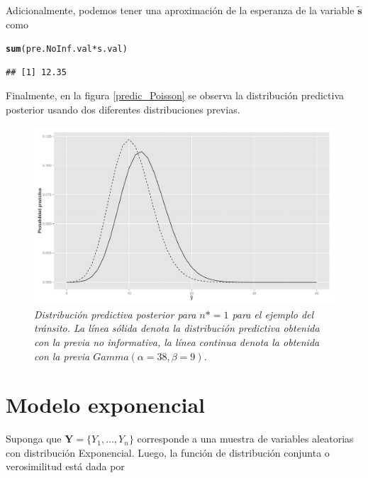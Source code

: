 \documentclass[10pt,openright]{book}\usepackage[]{graphicx}\usepackage[]{color}
\makeatletter
\newcommand{\hlopt}[1]{\textcolor[rgb]{0,0,0}{#1}}%
\newcommand{\hlstd}[1]{\textcolor[rgb]{0.345,0.345,0.345}{#1}}%
\newcommand{\hlkwd}[1]{\textcolor[rgb]{0.737,0.353,0.396}{\textbf{#1}}}%
\newenvironment{kframe}{%
 \def\at@end@of@kframe{}%
 \ifinner\ifhmode%
  \def\at@end@of@kframe{\end{minipage}}%
  \begin{minipage}{\columnwidth}%
 \fi\fi%
 \def\FrameCommand##1{\hskip\@totalleftmargin \hskip-\fboxsep
 \colorbox{shadecolor}{##1}\hskip-\fboxsep
     \hskip-\linewidth \hskip-\@totalleftmargin \hskip\columnwidth}%
 \MakeFramed {\advance\hsize-\width
   \@totalleftmargin\z@ \linewidth\hsize
   \@setminipage}}%
 {\par\unskip\endMakeFramed%
 \at@end@of@kframe}
\newenvironment{knitrout}{}{} %
\makeatother
\begin{document}
\begin{Eje}
    Adicionalmente, podemos tener una aproximaci\'on de la esperanza de la variable $\mathbf{\tilde{s}}$ como
\begin{knitrout}
\color{fgcolor}\begin{kframe}
\begin{alltt}
\hlkwd{sum}\hlstd{(pre.NoInf.val}\hlopt{*}\hlstd{s.val)}
\end{alltt}
\begin{verbatim}
## [1] 12.35
\end{verbatim}
\end{kframe}
\end{knitrout}
    
    Finalmente, en la figura \ref{predic_Poisson} se observa la distribuci\'on predictiva posterior usando dos diferentes distribuciones previas. 
    
    \begin{figure}[!h]\label{predic_Poisson}
    \centering
    \includegraphics[scale=0.4]{predpostpois.pdf}
    \caption{\emph{Distribuci\'on predictiva posterior para $n*=1$ para el ejemplo del tr\'ansito. La l\'inea s\'olida denota la distribuci\'on predictiva obtenida con la previa no informativa, la l\'inea continua denota la obtenida con la previa $Gamma(\alpha=38,\beta=9)$.}}
    \label{pred_post_pois}
    \end{figure}
    
    \end{Eje}
    
    \section{Modelo exponencial}
    
    Suponga que $\mathbf{Y}=\{Y_1,\ldots,Y_n\}$ corresponde a una muestra de variables aleatorias con distribuci\'on Exponencial. Luego, la funci\'on de distribuci\'on conjunta o verosimilitud est\'a dada por
    
\end{document}
